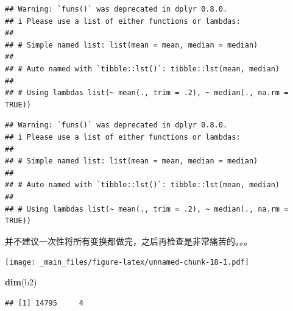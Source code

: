 \documentclass[
]{book}
\newenvironment{Shaded}{\begin{snugshade}}{\end{snugshade}}
\newcommand{\AttributeTok}[1]{\textcolor[rgb]{0.13,0.29,0.53}{#1}}
\newcommand{\CommentTok}[1]{\textcolor[rgb]{0.56,0.35,0.01}{\textit{#1}}}
\newcommand{\DecValTok}[1]{\textcolor[rgb]{0.00,0.00,0.81}{#1}}
\newcommand{\FunctionTok}[1]{\textcolor[rgb]{0.13,0.29,0.53}{\textbf{#1}}}
\newcommand{\NormalTok}[1]{#1}
\newcommand{\OtherTok}[1]{\textcolor[rgb]{0.56,0.35,0.01}{#1}}
\newcommand{\SpecialCharTok}[1]{\textcolor[rgb]{0.81,0.36,0.00}{\textbf{#1}}}
\begin{document}
\begin{verbatim}
## Warning: `funs()` was deprecated in dplyr 0.8.0.
## i Please use a list of either functions or lambdas:
## 
## # Simple named list: list(mean = mean, median = median)
## 
## # Auto named with `tibble::lst()`: tibble::lst(mean, median)
## 
## # Using lambdas list(~ mean(., trim = .2), ~ median(., na.rm = TRUE))
\end{verbatim}

\begin{verbatim}
## Warning: `funs()` was deprecated in dplyr 0.8.0.
## i Please use a list of either functions or lambdas:
## 
## # Simple named list: list(mean = mean, median = median)
## 
## # Auto named with `tibble::lst()`: tibble::lst(mean, median)
## 
## # Using lambdas list(~ mean(., trim = .2), ~ median(., na.rm = TRUE))
\end{verbatim}

并不建议一次性将所有变换都做完，之后再检查是非常痛苦的。。。

\begin{Shaded}
\end{Shaded}

\texttt{[image: \_main\_files/figure-latex/unnamed-chunk-18-1.pdf]}

\begin{Shaded}
\begin{Highlighting}[]
\FunctionTok{dim}\NormalTok{(b2)}
\end{Highlighting}
\end{Shaded}

\begin{verbatim}
## [1] 14795     4
\end{verbatim}
\end{document}
